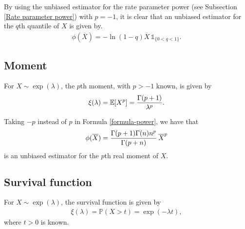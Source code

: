 \documentclass[12pt]{article}
\theoremstyle{definition}
\begin{document}
By using the unbiased estimator for the rate parameter power (see Subsection \ref{Rate parameter power})  with $p=-1$, it is clear that an  unbiased estimator for the $q$th quantile of $X$ is given by.
\begin{align*}
	\phi(\overline{X})= -\ln(1-q) \overline{X} \, \mathds{1}_{\{0<q<1\}}.
\end{align*}






\subsection{Moment}

For  $X\sim\exp(\lambda)$,  the $p$th  moment, with $p>-1$ known, is given by
\begin{align*}
	\xi(\lambda)=\mathbb{E}[X^p]={\Gamma(p+1)\over \lambda^p}.
\end{align*}

Taking $-p$ instead of $p$ in Formula \eqref{formula-power}, we have that
\begin{align*}
	\phi(\overline{X})
	=
	{\Gamma(p+1)\Gamma(n) n^p\over \Gamma(p+n)} \, \overline{X}^{p}
\end{align*}
is an unbiased estimator for the $p$th real moment of $X$.





\subsection{Survival function}
\label{Unbiased estimator for the survival function}

For $X\sim\exp(\lambda)$, the survival function is given by
\begin{align*}
	\xi(\lambda)=\mathbb{P}(X>t)=\exp(-\lambda t),
\end{align*}
where $t>0$ is known. 
\end{document}
